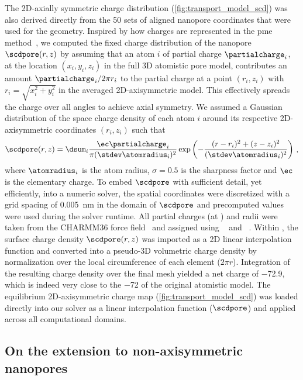 The 2D-axially symmetric charge distribution (\cref{fig:transport_model_scd}) was also derived directly from
the 50 sets of aligned nanopore coordinates that were used for the geometry. Inspired by how charges are
represented in the \gls{pme} method~\cite{Aksimentiev-2005}, we computed the fixed charge distribution of the
nanopore $\scdpore(r,z)$ by assuming that an atom $i$ of partial charge $\partialcharge_{i}$, at the location
$(x_i, y_i, z_i)$ in the full 3D atomistic pore model, contributes an amount $\partialcharge_{i}/2\pi r_i$ to
the partial charge at a point $(r_i,z_i)$ with $r_i = \sqrt{x_i^2 + y_i^2}$ in the averaged 2D-axisymmetric
model. This effectively spreads the charge over all angles to achieve axial symmetry. We assumed a Gaussian
distribution of the space charge density of each atom $i$ around its respective 2D-axisymmetric coordinates
$(r_i,z_i)$ such that
%
\begin{align}\label{eq:scdpore}
  \scdpore(r,z) = \dsum_{i} \dfrac{\ec\partialcharge_{i}}{\pi(\stdev\atomradius_{i})^2}
            \exp{\left(-\dfrac{(r-r_i)^2 + (z-z_i)^2}{(\stdev\atomradius_{i})^2}\right)}
  \text{ ,}
\end{align}
%
where $\atomradius_{i}$ is the atom radius, $\sigma = 0.5$ is the sharpness factor and $\ec$ is the
elementary charge. To embed $\scdpore$ with sufficient detail, yet efficiently, into a numeric solver, the
spatial coordinates were discretized with a grid spacing of \SI{0.005}{\nm} in the domain of $\scdpore$ and
precomputed values were used during the solver runtime. All partial charges (at ) and radii were taken
from the CHARMM36 force field~\cite{Best-2012} and assigned using ~\cite{Olsson-2011} and
~\cite{Jurrus-2018}. Within , the surface charge density $\scdpore(r,z)$ was
imported as a 2D linear interpolation function and converted into a pseudo-3D volumetric charge density by
normalization over the local circumference of each element ($2 \pi r$). Integration of the resulting charge
density over the final mesh yielded a net charge of \SI{-72.9}{\ec}, which is indeed very close to the
\SI{-72}{\ec} of the original atomistic model. The equilibrium 2D-axisymmetric charge map
(\cref{fig:transport_model_scd}) was loaded directly into our solver as a linear interpolation function
($\scdpore$) and applied across all computational domains.



\subsection{On the extension to non-axisymmetric nanopores}
%

